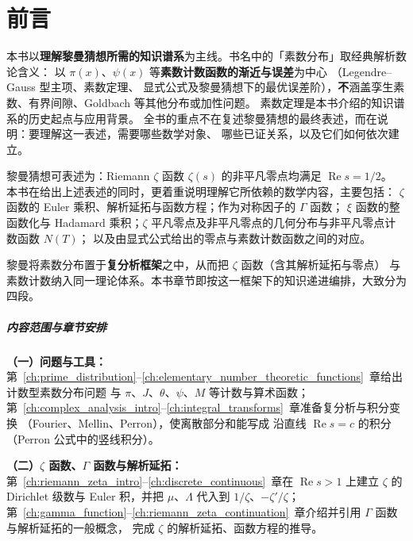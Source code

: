\chapter*{\texorpdfstring{\centering 前言}{前言}}
本书以\textbf{理解黎曼猜想所需的知识谱系}为主线。书名中的「素数分布」取经典解析数论含义：
以 $\pi(x)$、$\psi(x)$ 等\textbf{素数计数函数的渐近与误差}为中心
（Legendre--Gauss 型主项、素数定理、
显式公式及黎曼猜想下的最优误差阶），\textbf{不}涵盖孪生素数、有界间隙、Goldbach 等其他分布或加性问题。
素数定理是本书介绍的知识谱系的历史起点与应用背景。
全书的重点不在复述黎曼猜想的最终表述，而在说明：要理解这一表述，需要哪些数学对象、
哪些已证关系，以及它们如何依次建立。

黎曼猜想可表述为：Riemann $\zeta$ 函数 $\zeta(s)$ 的非平凡零点均满足 $\operatorname{Re}s=1/2$。
本书在给出上述表述的同时，更着重说明理解它所依赖的数学内容，主要包括：
$\zeta$ 函数的 Euler 乘积、解析延拓与函数方程；作为对称因子的 $\Gamma$ 函数；
$\xi$ 函数的整函数化与 Hadamard 乘积；$\zeta$ 平凡零点及非平凡零点的几何分布与非平凡零点计数函数 $N(T)$；
以及由显式公式给出的零点与素数计数函数之间的对应。

黎曼将素数分布置于\textbf{复分析框架}之中，从而把 $\zeta$ 函数（含其解析延拓与零点）
与素数计数纳入同一理论体系。本书章节即按这一框架下的知识递进编排，大致分为四段。

\paragraph{内容范围与章节安排}\mbox{}

\textbf{（一）问题与工具：}\\
第~\ref{ch:prime_distribution}--\ref{ch:elementary_number_theoretic_functions}~章给出计数型素数分布问题
与 $\pi$、$J$、$\theta$、$\psi$、$M$ 等计数与算术函数；
第~\ref{ch:complex_analysis_intro}--\ref{ch:integral_transforms}~章准备复分析与积分变换
（Fourier、Mellin、Perron），使离散部分和能写成
沿直线 $\operatorname{Re}s=c$ 的积分（Perron 公式中的竖线积分）。

\textbf{（二）$\zeta$ 函数、$\Gamma$ 函数与解析延拓：}\\
第~\ref{ch:riemann_zeta_intro}--\ref{ch:discrete_continuous}~章在 $\operatorname{Re}s>1$ 上建立
$\zeta$ 的 Dirichlet 级数与 Euler 积，并把 $\mu$、$\Lambda$ 代入到 $1/\zeta$、$-\zeta'/\zeta$；
第~\ref{ch:gamma_function}--\ref{ch:riemann_zeta_continuation}~章介绍并引用 $\Gamma$ 函数与解析延拓的一般概念，
完成 $\zeta$ 的解析延拓、函数方程的推导。

